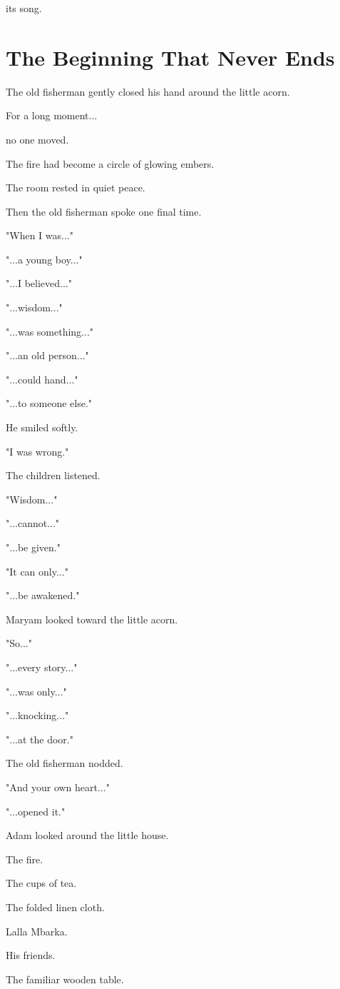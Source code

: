 \documentclass[12pt,openany]{book}
\begin{document}
its song.
\section*{The Beginning That Never Ends}

The old fisherman gently closed his hand around the little acorn.

For a long moment...

no one moved.

The fire had become a circle of glowing embers.

The room rested in quiet peace.

Then the old fisherman spoke one final time.

"When I was..."

"...a young boy..."

"...I believed..."

"...wisdom..."

"...was something..."

"...an old person..."

"...could hand..."

"...to someone else."

He smiled softly.

"I was wrong."

The children listened.

"Wisdom..."

"...cannot..."

"...be given."

"It can only..."

"...be awakened."

Maryam looked toward the little acorn.

"So..."

"...every story..."

"...was only..."

"...knocking..."

"...at the door."

The old fisherman nodded.

"And your own heart..."

"...opened it."

Adam looked around the little house.

The fire.

The cups of tea.

The folded linen cloth.

Lalla Mbarka.

His friends.

The familiar wooden table.
\end{document}

